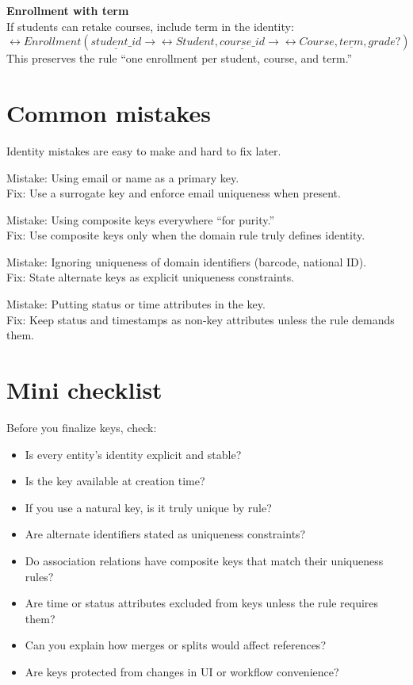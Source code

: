 \begin{examplebox}
\textbf{Enrollment with term}\\
If students can retake courses, include term in the identity:
\[
\rel{Enrollment}(\underline{student\_id} \rightarrow \rel{Student}, \underline{course\_id} \rightarrow \rel{Course}, \underline{term}, grade?)
\]
This preserves the rule “one enrollment per student, course, and term.”
\end{examplebox}

\section{Common mistakes}
Identity mistakes are easy to make and hard to fix later.

Mistake: Using email or name as a primary key.\\
Fix: Use a surrogate key and enforce email uniqueness when present.

Mistake: Using composite keys everywhere “for purity.”\\
Fix: Use composite keys only when the domain rule truly defines identity.

Mistake: Ignoring uniqueness of domain identifiers (barcode, national ID).\\
Fix: State alternate keys as explicit uniqueness constraints.

Mistake: Putting status or time attributes in the key.\\
Fix: Keep status and timestamps as non-key attributes unless the rule demands them.

\section{Mini checklist}
Before you finalize keys, check:
\begin{itemize}[leftmargin=*,nosep]
  \item Is every entity’s identity explicit and stable?
  \item Is the key available at creation time?
  \item If you use a natural key, is it truly unique by rule?
  \item Are alternate identifiers stated as uniqueness constraints?
  \item Do association relations have composite keys that match their uniqueness rules?
  \item Are time or status attributes excluded from keys unless the rule requires them?
  \item Can you explain how merges or splits would affect references?
  \item Are keys protected from changes in UI or workflow convenience?
\end{itemize}

